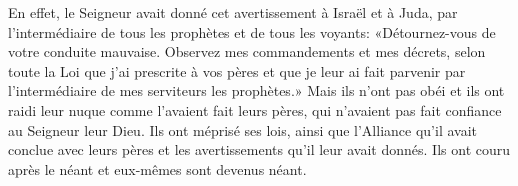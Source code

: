 En effet, le Seigneur avait donné cet avertissement à Israël et à Juda,
	par l’intermédiaire de tous les prophètes et de tous les voyants:
	«Détournez-vous de votre conduite mauvaise.
Observez mes commandements et mes décrets,
	selon toute la Loi que j’ai prescrite à vos pères
	et que je leur ai fait parvenir par l’intermédiaire de mes serviteurs les prophètes.»
Mais ils n’ont pas obéi et ils ont raidi leur nuque comme l’avaient fait leurs pères,
	qui n’avaient pas fait confiance au Seigneur leur Dieu.
Ils ont méprisé ses lois, ainsi que l’Alliance qu’il avait conclue avec leurs pères
	et les avertissements qu’il leur avait donnés.
Ils ont couru après le néant et eux-mêmes sont devenus néant.

